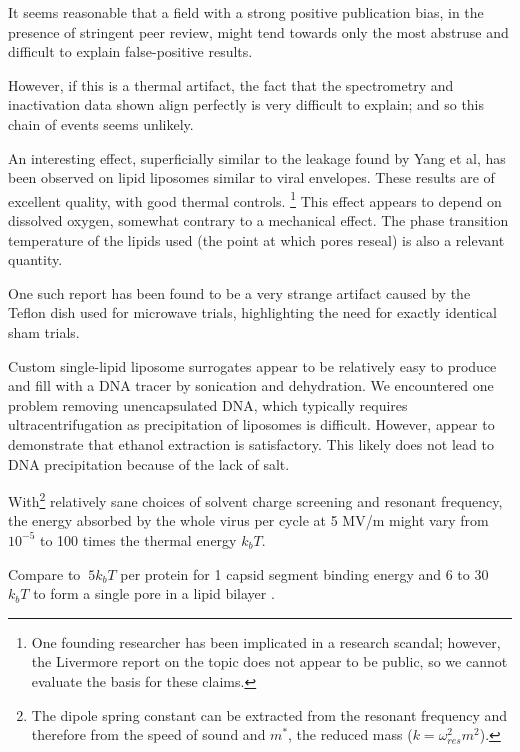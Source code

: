 \documentclass[paper.tex]{subfiles}
\begin{document}
\begin{multicols}{1}
It seems reasonable that a field with a strong positive publication bias\cite{Comprehensive2018}, in the presence of stringent peer review, might tend towards only the most abstruse and difficult to explain false-positive results. 

However, if this is a thermal artifact, the fact that the spectrometry and inactivation data shown align perfectly is very difficult to explain; and so this chain of events seems unlikely.

An interesting effect, superficially similar to the leakage found by Yang et al, has been observed on lipid liposomes similar to viral envelopes\cite{MicrowaveStimulated1985}\cite{Influence}\cite{Correlation1994}\cite{contribution2019}. These results are of excellent quality, with good thermal controls. \footnote{One founding researcher has been implicated in a research scandal; however, the Livermore report on the topic does not appear to be public, so we cannot evaluate the basis for these claims.} This effect appears to depend on dissolved oxygen\cite{Microwaves1987}\cite{Microwaves1988}, somewhat contrary to a mechanical effect. The phase transition temperature of the lipids used (the point at which pores reseal) is also a relevant quantity. 

One such report has been found to be a very strange artifact caused by the Teflon dish used for microwave trials\cite{Effect1994a}, highlighting the need for exactly identical sham trials.

Custom single-lipid liposome surrogates appear to be relatively easy to produce and fill with a DNA tracer by sonication and dehydration\cite{Encapsulation1982}\cite{OPTIMIZATION2017}\cite{Liposome2014}. We encountered one problem removing unencapsulated DNA, which typically requires ultracentrifugation as precipitation of liposomes is difficult. However, \cite{novela} appear to demonstrate that ethanol extraction is satisfactory. This likely does not lead to DNA precipitation because of the lack of salt. 

With\footnote{The dipole spring constant can be extracted from the resonant frequency and therefore from the speed of sound and $m^*$, the reduced mass ($k = \omega_{res}^2 m^2$). } relatively sane choices of solvent charge screening and resonant frequency, the energy absorbed by the whole virus per cycle at 5 MV/m might vary from $10^{-5}$ to 100 times the thermal energy $k_b T$.

Compare to $~5 k_b T$ per protein for 1 capsid segment binding energy \cite{Energies2012} \cite{Weak2002} and 6 to 30 $k_b T$ to form a single pore in a lipid bilayer \cite{Atomistic2014}.


\end{multicols}
\end{document}

